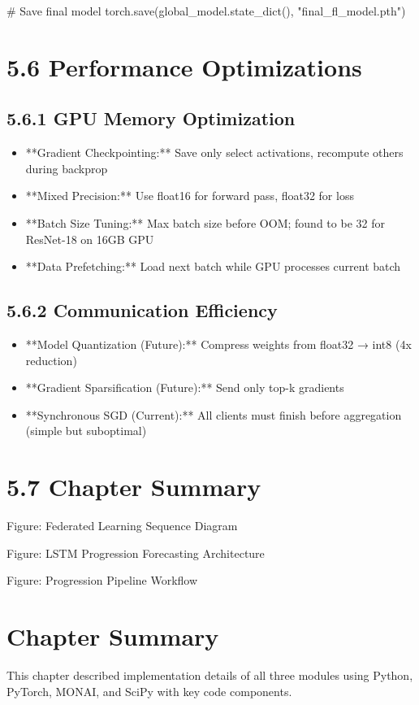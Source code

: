 \# Save final model
torch.save(global\_model.state\_dict(), "final\_fl\_model.pth")


\section{5.6 Performance Optimizations}

\subsection{5.6.1 GPU Memory Optimization}
\begin{itemize}
  \item **Gradient Checkpointing:** Save only select activations, recompute others during backprop
  \item **Mixed Precision:** Use float16 for forward pass, float32 for loss
  \item **Batch Size Tuning:** Max batch size before OOM; found to be 32 for ResNet-18 on 16GB GPU
  \item **Data Prefetching:** Load next batch while GPU processes current batch
\end{itemize}


\subsection{5.6.2 Communication Efficiency}
\begin{itemize}
  \item **Model Quantization (Future):** Compress weights from float32 → int8 (4x reduction)
  \item **Gradient Sparsification (Future):** Send only top-k gradients
  \item **Synchronous SGD (Current):** All clients must finish before aggregation (simple but suboptimal)
\end{itemize}


\section{5.7 Chapter Summary}
Figure: Federated Learning Sequence Diagram

Figure: LSTM Progression Forecasting Architecture

Figure: Progression Pipeline Workflow


\section{Chapter Summary}
This chapter described implementation details of all three modules using Python, PyTorch, MONAI, and SciPy with key code components.


